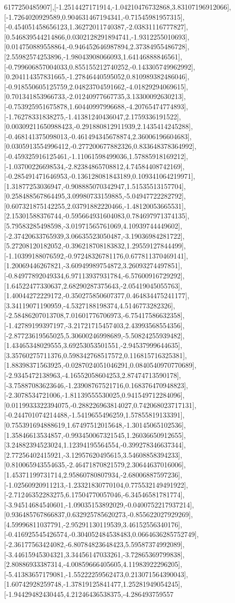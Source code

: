 \documentclass{article}
\begin{document}
6177250485907],[-1.2514427171914,-1.04210476732868,3.83107196912066],[-1.7264020929589,0.904631467194341,-0.71545981957315],[-0.454051458656123,1.36272011740387,-2.03831116777827],[0.546839544214866,0.0302128291894741,-1.9312255010693],[0.014750889558864,-0.946452646987894,2.37384955486728],[2.55982574253896,-1.98043908066093,1.64146888846561],[-0.799606857004033,0.855155212740252,-0.143305749962992],[0.204114357831665,-1.27846440595052,0.810989382486046],[-0.918550605125759,2.04823704591662,-4.01829294069615],[0.701341853966733,-2.01240977667735,3.13300092630213],[-0.753925951675878,1.60440997996688,-4.20765474774893],[-1.76278331838275,-1.41381240436047,2.1759336191522],[0.00309211650988423,-0.291880812911939,2.1435414245288],[-0.468141375098013,-0.461494345678874,2.36006196604683],[0.0305913554996412,-0.277200677882326,0.833648378364992],[-0.459325916125461,-1.11061598499036,1.57885918169212],[-1.03700226698534,-2.82384865708812,4.74584408742169],[-0.285491471646953,-0.136128081843189,0.109341064219971],[1.31877253036947,-0.908885070342947,1.51535513157704],[0.258488567864495,3.09980733159885,-5.04947722282792],[0.607321875142255,2.03791882220466,-1.48120053665531],[2.15301588376744,-0.595664931604083,0.784697971374135],[5.79583285498598,-3.01971565761069,4.10939744449602],[-2.37420633765939,3.06635523050487,-3.19036984281722],[5.27208120182052,-0.396218708183832,1.29559127844499],[-1.10399188076592,-0.97248326781176,0.677811370469141],[1.20069446267821,-3.60949989754872,3.26093274497851],[-0.84977892049334,6.97113937931784,-6.57600916729292],[1.64522477330637,2.68290287375643,-2.05419045055763],[1.40044272229172,-0.350275850607377,0.464834475241177],[3.34119071190959,-4.5327188198374,4.5146773282326],[-2.58486207013708,7.01601776706973,-6.75417586632358],[-1.42789199397197,-3.21721715457403,2.43993568554356],[-2.87723619565025,5.30600246998689,-5.50824255939482],[1.43465348029555,3.69253053501551,-2.94537999644635],[3.35760275711376,0.598342768517572,0.116815716325381],[1.88398371563925,-0.0287024051046291,0.0840540970770689],[-2.9345472138963,-4.16552058604253,2.87474713590178],[-3.75887083623646,-1.23908767521716,0.168376470948823],[-2.3078534721006,-1.81139555530025,0.941549712284096],[0.0119933322394075,-0.288226963814027,0.742068023717131],[-0.244701074214488,-1.5419655496259,1.57855819133391],[0.755391694888619,1.67497512015648,-1.30145065102536],[1.35846613534857,-0.993450067321545,1.26036650912655],[3.24882394523024,1.12394195564554,-0.399278346637344],[2.77256402415921,-3.12957620495615,3.54608858394233],[0.810065943554635,-2.46471870821579,2.30644637016006],[1.45371199731714,2.95860780807934,-2.68006887597236],[-1.02560920911213,-1.23321830770104,0.775532149491922],[-2.71246352283275,6.17504770057046,-6.34546581781774],[-3.94514684540601,-1.09035153892029,-0.0400752217937214],[0.936485767866837,0.632925785620273,-0.855622027929269],[4.59996811037791,-2.95291130119539,3.46152556340176],[-0.416925545426574,-0.304052484538483,0.0664636285752749],[-2.36177563424082,-6.80784823648423,5.59587374992089],[-3.44615945304321,3.34456147033261,-3.72865369799838],[2.80886933387314,-4.00859666405605,4.11983922296205],[-5.41383657179081,-1.55222259562473,0.213071564390043],[1.60742928259748,-1.37819125841477,1.25281949054245],[-1.94429482430445,4.21246436538375,-4.286493759557
\end{document}

